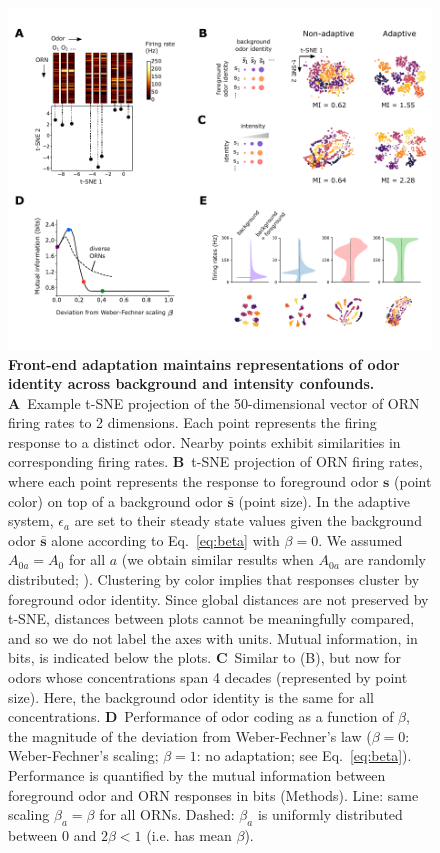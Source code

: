\documentclass[9pt,lineno]{elife}
\begin{document}
\begin{figure}
	\begin{fullwidth}
	\includegraphics[width=.95\linewidth]{figure2}
	\caption{\footnotesize{\textbf{Front-end adaptation maintains representations of odor identity across background and intensity confounds.}
			\textbf{A}~Example t-SNE projection of the 50-dimensional vector of ORN firing rates to 2 dimensions. Each point represents the firing response to a distinct odor. Nearby points exhibit similarities in corresponding firing rates.
			\textbf{B}~t-SNE projection of ORN firing rates, where each point represents the response to foreground odor $\mathbf{s}$ (point color) on top of a background odor $\bar{\mathbf{s}}$ (point size). In the adaptive system, $\epsilon_a$ are set to their steady state values given the background odor $\bar{\mathbf{s}}$ alone according to Eq.~\ref{eq:beta} with $\beta=0$. We assumed $A_{0a}=A_0$ for all $a$ (we obtain similar results when $A_{0a}$ are randomly distributed; ). Clustering by color implies that responses cluster by foreground odor identity. Since global distances are not preserved by t-SNE, distances between plots cannot be meaningfully compared, and so we do not label the axes with units. Mutual information, in bits, is indicated below the plots.
			\textbf{C}~Similar to (B), but now for odors whose concentrations span 4 decades (represented by point size). Here, the background odor identity is the same for all concentrations. 
			\textbf{D}~Performance of odor coding as a function of $\beta$, the magnitude of the deviation from Weber-Fechner's law ($\beta=0$: Weber-Fechner's scaling; $\beta=1$: no adaptation; see Eq.~\ref{eq:beta}). Performance is quantified by the mutual information between foreground odor and ORN responses in bits (Methods). Line: same scaling $\beta_a=\beta$ for all ORNs. Dashed: $\beta_a$ is uniformly distributed between 0 and $2\beta < 1$ (i.e. has mean $\beta$).
}}
\end{fullwidth}
\end{figure}
\end{document}

